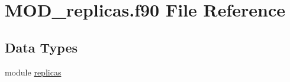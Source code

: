 \hypertarget{MOD__replicas_8f90}{\section{M\-O\-D\-\_\-replicas.\-f90 File Reference}
\label{MOD__replicas_8f90}
}
\subsection*{Data Types}
\begin{DoxyCompactItemize}
\item 
module \hyperlink{classreplicas}{replicas}
\end{DoxyCompactItemize}
